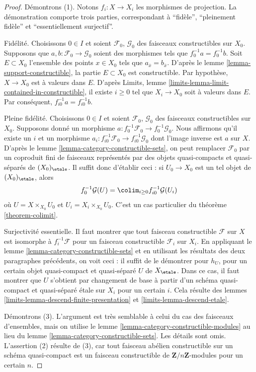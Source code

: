 \begin{proof}
Démontrons (1). Notons $f_i : X \to X_i$ les morphismes de projection.
La démonstration comporte trois parties, correspondant à ``fidèle'',
``pleinement fidèle'' et ``essentiellement surjectif''.

\medskip\noindent
Fidélité. Choisissons $0 \in I$ et soient $\mathcal{F}_0$, $\mathcal{G}_0$ des
faisceaux constructibles sur $X_0$. Supposons que
$a, b : \mathcal{F}_0 \to \mathcal{G}_0$ soient des morphismes tels que
$f_0^{-1}a = f_0^{-1}b$. Soit $E \subset X_0$ l'ensemble
des points $x \in X_0$ tels que $a_{\overline{x}} = b_{\overline{x}}$.
D'après le lemme \ref{lemma-support-constructible}, la partie
$E \subset X_0$ est constructible. Par hypothèse, $X \to X_0$ est à valeurs dans $E$.
D'après Limits, lemme \ref{limits-lemma-limit-contained-in-constructible},
il existe $i \geq 0$ tel que $X_i \to X_0$ soit à valeurs dans $E$.
Par conséquent, $f_{i0}^{-1}a = f_{i0}^{-1}b$.

\medskip\noindent
Pleine fidélité. Choisissons $0 \in I$ et soient $\mathcal{F}_0$, $\mathcal{G}_0$ des
faisceaux constructibles sur $X_0$. Supposons donné un morphisme
$a : f_0^{-1}\mathcal{F}_0 \to f_0^{-1}\mathcal{G}_0$.
Nous affirmons qu'il existe un $i$ et un morphisme
$a_i : f_{i0}^{-1}\mathcal{F}_0 \to f_{i0}^{-1}\mathcal{G}_0$
dont l'image inverse est $a$ sur $X$.
D'après le lemme \ref{lemma-category-constructible-sets},
on peut remplacer $\mathcal{F}_0$
par un coproduit fini de faisceaux représentés par des objets quasi-compacts
et quasi-séparés de $(X_0)_\etale$.
Il suffit donc d'établir ceci : si $U_0 \to X_0$ est un tel objet
de $(X_0)_\etale$, alors
$$
f_0^{-1}\mathcal{G}(U) = \colim_{i \geq 0} f_{i0}^{-1}\mathcal{G}(U_i)
$$
où $U = X \times_{X_0} U_0$ et $U_i = X_i \times_{X_0} U_0$.
C'est un cas particulier du théorème \ref{theorem-colimit}.

\medskip\noindent
Surjectivité essentielle. Il faut montrer que tout faisceau constructible $\mathcal{F}$
sur $X$ est isomorphe à $f_i^{-1}\mathcal{F}$ pour un faisceau constructible
$\mathcal{F}_i$ sur $X_i$. En appliquant le
lemme \ref{lemma-category-constructible-sets}
et en utilisant les résultats des deux paragraphes précédents, on voit ceci :
il suffit de le démontrer pour $h_U$, pour un certain objet quasi-compact
et quasi-séparé $U$ de $X_\etale$.
Dans ce cas, il faut montrer que $U$ s'obtient par changement de base à partir d'un
schéma quasi-compact et quasi-séparé \'etale sur $X_i$ pour un certain $i$.
Cela résulte des
lemmes \ref{limits-lemma-descend-finite-presentation} et
\ref{limits-lemma-descend-etale}.

\medskip\noindent
Démontrons (3). L'argument est très semblable à celui du cas des
faisceaux d'ensembles, mais on utilise le
lemme \ref{lemma-category-constructible-modules}
au lieu du
lemme \ref{lemma-category-constructible-sets}. Les détails sont omis.
L'assertion (2) résulte de (3), car tout faisceau abélien constructible
sur un schéma quasi-compact est un faisceau constructible de
$\mathbf{Z}/n\mathbf{Z}$-modules pour un certain $n$.
\end{proof}

